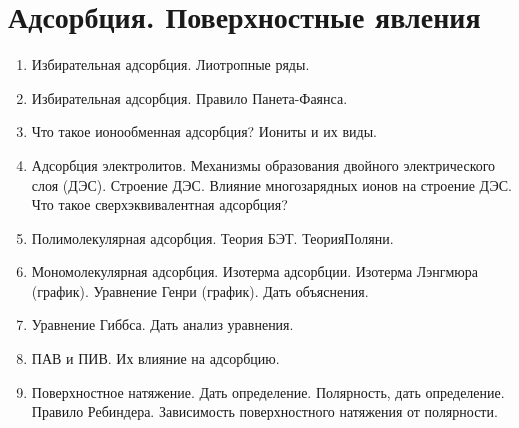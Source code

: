 %
%
%
\section{Адсорбция. Поверхностные явления}
\begin{enumerate}
\item
Избирательная адсорбция. Лиотропные ряды.
 
\item
Избирательная адсорбция. Правило Панета-Фаянса.
 
\item
Что такое ионообменная адсорбция? Иониты и их виды.
 
\item
Адсорбция электролитов. Механизмы образования двойного электрического слоя (ДЭС). Строение ДЭС. Влияние многозарядных ионов на строение ДЭС. Что такое сверхэквивалентная адсорбция?
 
\item
Полимолекулярная адсорбция. Теория БЭТ. ТеорияПоляни.
 
\item
Мономолекулярная адсорбция. Изотерма адсорбции.  Изотерма Лэнгмюра (график). Уравнение Генри (график). Дать объяснения.
 
\item
Уравнение Гиббса. Дать анализ уравнения.
 
\item
ПАВ и ПИВ. Их влияние на адсорбцию.
 
\item
Поверхностное натяжение. Дать определение. Полярность, дать определение. Правило Ребиндера. Зависимость поверхностного натяжения от полярности.
 
\end{enumerate}
%
